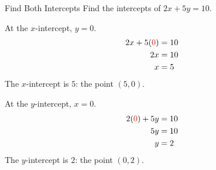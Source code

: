 \documentclass[11pt]{article}
\newif\ifanswers
\newcommand{\sv}[1]{{\color{sub}#1}}
\newcommand{\strand}[1]{\bigskip{\large\bfseries\sffamily #1}\par\smallskip}
\begin{document}
\ifanswers
\strand{Find both intercepts}
\else
\begin{example}{Find Both Intercepts}
Find the intercepts of $2x + 5y = 10$.

\smallskip
\begin{minipage}[t]{0.47\linewidth}\raggedright
At the $x$-intercept, $y = 0$.
\begin{align*}
  2x + 5(\sv{0}) &= 10 \\
  2x &= 10 \\
  x &= 5
\end{align*}
The $x$-intercept is $5$: the point $(5, 0)$.
\end{minipage}\hfill
\begin{minipage}[t]{0.47\linewidth}\raggedright
At the $y$-intercept, $x = 0$.
\begin{align*}
  2(\sv{0}) + 5y &= 10 \\
  5y &= 10 \\
  y &= 2
\end{align*}
The $y$-intercept is $2$: the point $(0, 2)$.
\end{minipage}
\end{example}
\fi
\end{document}
